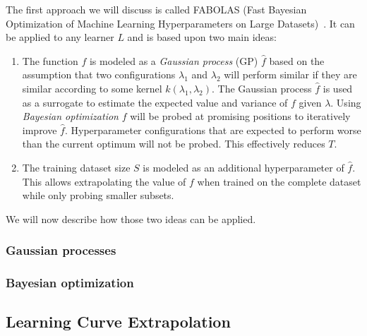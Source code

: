 The first approach we will discuss is called FABOLAS (Fast Bayesian Optimization of Machine Learning Hyperparameters on Large Datasets)~\cite{Klein2016}.
It can be applied to any learner \(L\) and is based upon two main ideas:
\begin{enumerate}
	\item The function \(f\) is modeled as a \textit{Gaussian process} (GP) \(\hat{f}\) based on the assumption that two configurations \(\lambda_1\) and \(\lambda_2\) will perform similar if they are similar according to some kernel \(k(\lambda_1, \lambda_2)\).
		The Gaussian process \(\hat{f}\) is used as a surrogate to estimate the expected value and variance of \(f\) given \(\lambda\).
		Using \textit{Bayesian optimization} \(f\) will be probed at promising positions to iteratively improve \(\hat{f}\).
		Hyperparameter configurations that are expected to perform worse than the current optimum will not be probed.
		This effectively reduces \(T\).
	\item The training dataset size \(S\) is modeled as an additional hyperparameter of \(\hat{f}\).
		This allows extrapolating the value of \(f\) when trained on the complete dataset while only probing smaller subsets.
\end{enumerate}
We will now describe how those two ideas can be applied.

\subsubsection{Gaussian processes}%
\label{sec:hyperparams:fabolas:gaussian}



\subsubsection{Bayesian optimization}%
\label{sec:hyperparams:fabolas:bayesian}


\subsection{Learning Curve Extrapolation}%
\label{sec:hyperparams:earlyterm}
